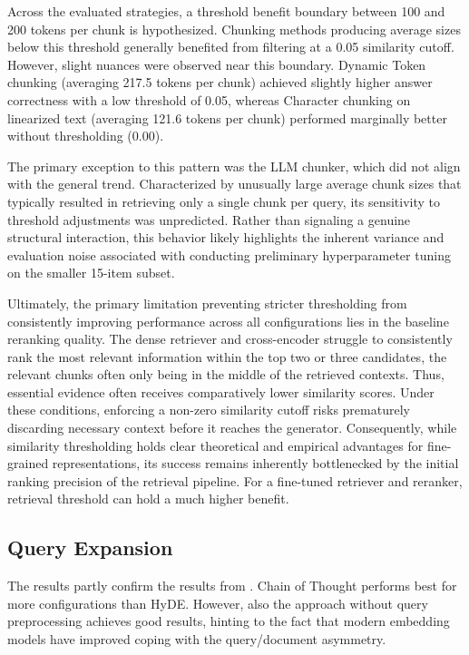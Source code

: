 \documentclass[12pt]{article} %
\begin{document}
Across the evaluated strategies, a threshold benefit boundary between 100 and 200 tokens per chunk is hypothesized. Chunking methods producing average sizes below this threshold generally benefited from filtering at a 0.05 similarity cutoff. However, slight nuances were observed near this boundary. Dynamic Token chunking (averaging 217.5 tokens per chunk) achieved slightly higher answer correctness with a low threshold of 0.05, whereas Character chunking on linearized text (averaging 121.6 tokens per chunk) performed marginally better without thresholding (0.00).

The primary exception to this pattern was the LLM chunker, which did not align with the general trend. Characterized by unusually large average chunk sizes that typically resulted in retrieving only a single chunk per query, its sensitivity to threshold adjustments was unpredicted. Rather than signaling a genuine structural interaction, this behavior likely highlights the inherent variance and evaluation noise associated with conducting preliminary hyperparameter tuning on the smaller 15-item subset.

Ultimately, the primary limitation preventing stricter thresholding from consistently improving performance across all configurations lies in the baseline reranking quality. The dense retriever and cross-encoder struggle to consistently rank the most relevant information within the top two or three candidates, the relevant chunks often only being in the middle of the retrieved contexts. Thus, essential evidence often receives comparatively lower similarity scores. Under these conditions, enforcing a non-zero similarity cutoff risks prematurely discarding necessary context before it reaches the generator. Consequently, while similarity thresholding holds clear theoretical and empirical advantages for fine-grained representations, its success remains inherently bottlenecked by the initial ranking precision of the retrieval pipeline. For a fine-tuned retriever and reranker, retrieval threshold can hold a much higher benefit.
\subsection{Query Expansion}
The results partly confirm the results from \textcite{jagerman2023query}. Chain of Thought performs best for more configurations than HyDE. However, also the approach without query preprocessing achieves good results, hinting to the fact that modern embedding models have improved coping with the query/document asymmetry.
\end{document}

